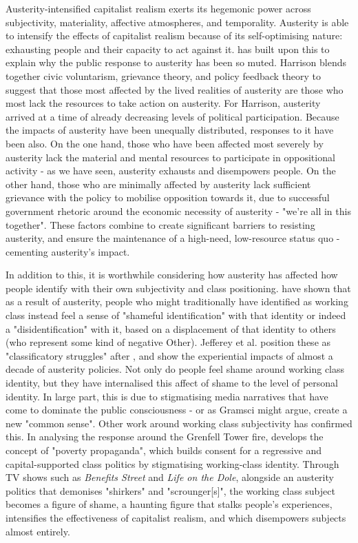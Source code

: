 Austerity-intensified capitalist realism exerts its hegemonic power across subjectivity, materiality, affective atmospheres, and temporality. Austerity is able to intensify the effects of capitalist realism because of its self-optimising nature: exhausting people and their capacity to act against it. \citet{harrison_cant_2020} has built upon this to explain why the public response to austerity has been so muted. Harrison blends together civic voluntarism, grievance theory, and policy feedback theory to suggest that those most affected by the lived realities of austerity are those who most lack the resources to take action on austerity. For Harrison, austerity arrived at a time of already decreasing levels of political participation. Because the impacts of austerity have been unequally distributed, responses to it have been also. On the one hand, those who have been affected most severely by austerity lack the material and mental resources to participate in oppositional activity - as we have seen, austerity exhausts and disempowers people. On the other hand, those who are minimally affected by austerity lack sufficient grievance with the policy to mobilise opposition towards it, due to successful government rhetoric around the economic necessity of austerity - "we're all in this together". These factors combine to create significant barriers to resisting austerity, and ensure the maintenance of a high-need, low-resource status quo - cementing austerity's impact.

In addition to this, it is worthwhile considering how austerity has affected how people identify with their own subjectivity and class positioning. \citet{jeffery_classificatory_2019}  have shown that as a result of austerity, people who might traditionally have identified as working class instead feel a sense of "shameful identification" with that identity or indeed a "disidentification" with it, based on a displacement of that identity to others (who represent some kind of negative Other). Jefferey et al. position these as "classificatory struggles" after \citet{tyler_classificatory_2015}, and show the experiential impacts of almost a decade of austerity policies. Not only do people feel shame around working class identity, but they have internalised this affect of shame to the level of personal identity. In large part, this is due to stigmatising media narratives that have come to dominate the public consciousness - or as Gramsci might argue, create a new "common sense". Other work around working class subjectivity has confirmed this. In analysing the response around the Grenfell Tower fire, \citet{shildrick_lessons_2018} develops the concept of "poverty propaganda", which builds consent for a regressive and capital-supported class politics by stigmatising working-class identity. Through TV shows such as \emph{Benefits Street} and \emph{Life on the Dole}, alongside an austerity politics that demonises "shirkers" and "scrounger[s]", the working class subject becomes a figure of shame, a haunting figure that stalks people's experiences, intensifies the effectiveness of capitalist realism, and which disempowers subjects almost entirely.

